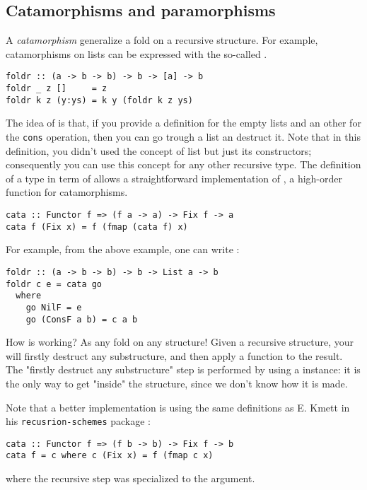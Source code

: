 \subsection{Catamorphisms and paramorphisms}
A \emph{catamorphism} generalize a fold on a recursive structure. For example, catamorphisms on lists can be expressed with the so-called .
\begin{verbatim}
foldr :: (a -> b -> b) -> b -> [a] -> b
foldr _ z []     = z
foldr k z (y:ys) = k y (foldr k z ys)
\end{verbatim}
The idea of  is that, if you provide a definition for the empty lists and an other for the \verb|cons| operation, then you can go trough a list an destruct it. Note that in this definition, you didn't used the concept of list but just its constructors; consequently you can use this concept for any other recursive type. The definition of a type in term of  allows a straightforward implementation of , a high-order function for catamorphisms.

\begin{verbatim}
cata :: Functor f => (f a -> a) -> Fix f -> a
cata f (Fix x) = f (fmap (cata f) x)
\end{verbatim}
For example,  from the above example, one can write :
\begin{verbatim}
foldr :: (a -> b -> b) -> b -> List a -> b
foldr c e = cata go
  where
    go NilF = e
    go (ConsF a b) = c a b
\end{verbatim}

How  is working? As any fold on any structure! Given a recursive structure, your will firstly destruct any substructure, and then apply a function to the result. The "firstly destruct any substructure" step is performed by using a  instance: it is the only way to get "inside" the structure, since we don't know how it is made.

Note that a better implementation is using the same definitions as E. Kmett in his \verb|recusrion-schemes| package \cite{ekmett:eschems}:

\begin{verbatim}
cata :: Functor f => (f b -> b) -> Fix f -> b
cata f = c where c (Fix x) = f (fmap c x)
\end{verbatim}

\noindent
where the recursive step was specialized to the  argument.

